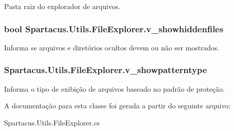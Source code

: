 Pasta raiz do explorador de arquivos. 

\hypertarget{classSpartacus_1_1Utils_1_1FileExplorer_ac0811882d93d76fb122f8aad7ec7b15d}{
\subsubsection[{v\+\_\+showhiddenfiles}]{\setlength{\rightskip}{0pt plus 5cm}bool Spartacus.\+Utils.\+File\+Explorer.\+v\+\_\+showhiddenfiles}}\label{classSpartacus_1_1Utils_1_1FileExplorer_ac0811882d93d76fb122f8aad7ec7b15d}


Informa se arquivos e diretórios ocultos devem ou não ser mostrados. 

\hypertarget{classSpartacus_1_1Utils_1_1FileExplorer_af5b66d2bdb32bac1793c470e913546b6}{
\subsubsection[{v\+\_\+showpatterntype}]{ Spartacus.\+Utils.\+File\+Explorer.\+v\+\_\+showpatterntype}}\label{classSpartacus_1_1Utils_1_1FileExplorer_af5b66d2bdb32bac1793c470e913546b6}


Informa o tipo de exibição de arquivos baseado no padrão de proteção. 



A documentação para esta classe foi gerada a partir do seguinte arquivo\+:\begin{DoxyCompactItemize}
\item 
Spartacus.\+Utils.\+File\+Explorer.\+cs\end{DoxyCompactItemize}
